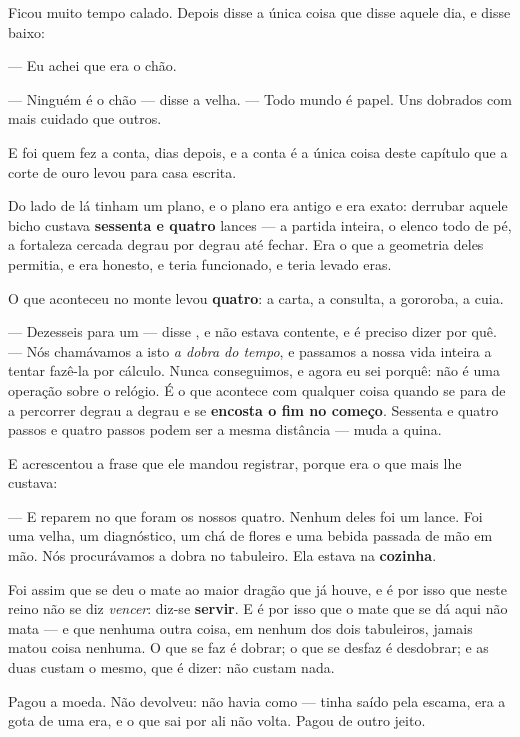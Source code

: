 \documentclass[livro.tex]{subfiles}
\begin{document}
Ficou muito tempo calado. Depois disse a única coisa que disse aquele dia, e disse baixo:

--- Eu achei que era o chão.

--- Ninguém é o chão --- disse a velha. --- Todo mundo é papel. Uns dobrados com mais cuidado que
outros.

\medskip

\medskip

E foi \Drk quem fez a conta, dias depois, e a conta é a única coisa deste capítulo que a corte
de ouro levou para casa escrita.

Do lado de lá tinham um plano, e o plano era antigo e era exato: derrubar aquele bicho custava
\textbf{sessenta e quatro} lances --- a partida inteira, o elenco todo de pé, a fortaleza cercada
degrau por degrau até fechar. Era o que a geometria deles permitia, e era honesto, e teria
funcionado, e teria levado eras.

O que aconteceu no monte levou \textbf{quatro}: a carta, a consulta, a gororoba, a cuia.

--- Dezesseis para um --- disse \Drk , e não estava contente, e é preciso dizer por quê. ---
Nós chamávamos a isto \emph{a dobra do tempo}, e passamos a nossa vida inteira a tentar fazê-la
por cálculo. Nunca conseguimos, e agora eu sei porquê: não é uma operação sobre o relógio. É o
que acontece com qualquer coisa quando se para de a percorrer degrau a degrau e se
\textbf{encosta o fim no começo}. Sessenta e quatro passos e quatro passos podem ser a mesma
distância --- muda a quina.

E acrescentou a frase que ele mandou registrar, porque era o que mais lhe custava:

--- E reparem no que foram os nossos quatro. Nenhum deles foi um lance. Foi uma velha, um
diagnóstico, um chá de flores e uma bebida passada de mão em mão. Nós procurávamos a dobra no
tabuleiro. Ela estava na \textbf{cozinha}.

\medskip

Foi assim que se deu o mate ao maior dragão que já houve, e é por isso que neste reino não se
diz \emph{vencer}: diz-se \textbf{servir}. E é por isso que o mate que se dá aqui não mata --- e
que nenhuma outra coisa, em nenhum dos dois tabuleiros, jamais matou coisa nenhuma. O que se faz
é dobrar; o que se desfaz é desdobrar; e as duas custam o mesmo, que é dizer: não custam nada.

\medskip

Pagou a moeda. Não devolveu: não havia como --- tinha saído pela escama, era a gota de uma era, e
o que sai por ali não volta. Pagou de outro jeito.
\end{document}
